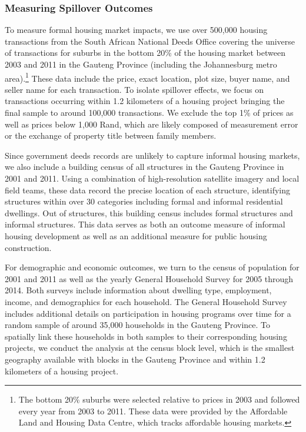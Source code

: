 \documentclass[12pt]{article}
\begin{document}
\subsubsection{Measuring Spillover Outcomes}

To measure formal housing market impacts, we use over 500,000 housing transactions from the South African National Deeds Office covering the universe of transactions for suburbs in the bottom 20\% of the housing market between 2003 and 2011 in the Gauteng Province (including the Johannesburg metro area).\footnote{The bottom 20\% suburbs were selected relative to prices in 2003 and followed every year from 2003 to 2011.  These data were provided by the Affordable Land and Housing Data Centre, which tracks affordable housing markets.}  These data include the price, exact location, plot size, buyer name, and seller name for each transaction.  To isolate spillover effects, we focus on transactions occurring within 1.2 kilometers of a housing project bringing the final sample to around 100,000 transactions.  We exclude the top 1\% of prices as well as prices below 1,000 Rand, which are likely composed of measurement error or the exchange of property title between family members.

Since government deeds records are unlikely to capture informal housing markets, we also include a building census of all structures in the Gauteng Province in 2001 and 2011.  Using a combination of high-resolution satellite imagery and local field teams, these data record the precise location of each structure, identifying structures within over 30 categories including formal and informal residential dwellings.  Out of structures, this building census includes formal structures and informal structures.  This data serves as both an outcome measure of informal housing development as well as an additional measure for public housing construction.

For demographic and economic outcomes, we turn to the census of population for 2001 and 2011 as well as the yearly General Household Survey for 2005 through 2014.  Both surveys include information about dwelling type, employment, income, and demographics for each household.  The General Household Survey includes additional details on participation in housing programs over time for a random sample of around 35,000 households in the Gauteng Province.  To spatially link these households in both samples to their corresponding housing projects, we conduct the analysis at the census block level, which is the smallest geography available with blocks in the Gauteng Province and within 1.2 kilometers of a housing project.  
\end{document}
